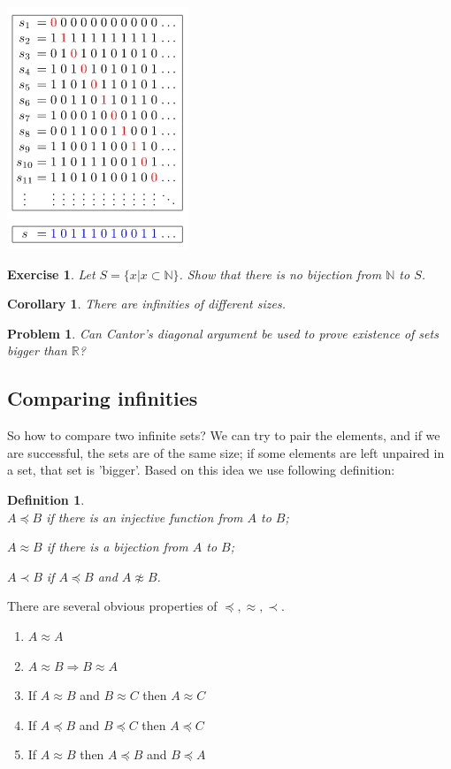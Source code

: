 \documentclass[11pt,a5paper]{article}
\newtheorem{definition}{Definition}
\newtheorem{exercise}{Exercise}
\newtheorem{problem}{Problem}
\newtheorem*{corollary}{Corollary}
\begin{document}
\includegraphics[scale=0.8]{cda}
\begin{exercise} Let $S=\{x|x\subset \mathbb{N}\}$. Show that there is no bijection from $\mathbb{N}$ to $S$.
\end{exercise}
\begin{corollary} There are infinities of different sizes.
\end{corollary}
\begin{problem} Can Cantor's diagonal argument be used to prove existence of sets bigger than $\mathbb{R}$?
\end{problem}

\subsection*{Comparing infinities}

\noindent So how to compare two infinite sets? We can try to pair the elements, and if we are successful, the sets are of the same size; if some elements are left unpaired in a set, that set is 'bigger'. Based on this idea we use following definition:

\begin{definition}\ \\
\indent $A\preceq B$ if there is an injective function from $A$ to $B$;

$A\approx B$ if there is a bijection from $A$ to $B$; 

$A\prec B$ if $A\preceq B$ and $A\not\approx B$.
\end{definition}


\noindent There are several obvious properties of $\preceq, \approx, \prec$.
\begin{enumerate}
  \item $A\approx A$
  \item $A\approx B \Rightarrow B\approx A$
  \item If $A\approx B$ and $B\approx C$ then $A\approx C$
  \item If $A\preceq B$ and $B\preceq C$ then $A\preceq C$
  \item If $A\approx B$ then $A\preceq B$ and $B\preceq A$
\end{enumerate}
\end{document}
